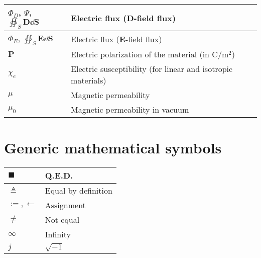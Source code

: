\documentclass{article}
\begin{document}
\begin{xltabular}{\textwidth}{XX}
	\(\Phi_D\)\cite{wiki:D-field-flux}, \(\varPsi\)\cite{ramoFieldsWavesCommunication1994}, \(\oiint_S \mathbf{D} \dd{\mathbf{S}}\)     & Electric flux (\(\mathbf{D}\)-field flux)                                                                                                                       \\ \hline
	\(\Phi_E\)\cite{wiki:electric-flux}, \(\oiint_S \mathbf{E} \dd{\mathbf{S}}\)              & Electric flux (\(\mathbf{E}\)-field flux)                                                                                                                      \\ \hline
	\(\mathbf{P}\)                                               & Electric polarization of the material (in \(\si{\coulomb\per\meter\squared}\))                                                                                                           \\ \hline
	\(\chi_e\)                                                   & Electric susceptibility (for linear and isotropic materials)                                                                                                                             \\ \hline
	\(\mu\)                                                      & Magnetic permeability                                                                                                                                                                    \\ \hline
	\(\mu_0\)                                                    & Magnetic permeability in vacuum                                                                                                                                                          \\
\end{xltabular}

\section{Generic mathematical symbols}
\begin{xltabular}{\textwidth}{XX}
	\(\blacksquare\)   & Q.E.D.                                            \\ \hline
	\(\triangleq\)     & Equal by definition                               \\ \hline
	\(:=, \leftarrow\) & Assignment \cite{rosenDiscreteMathematicsIts2011} \\ \hline
	\(\neq\)           & Not equal                                         \\ \hline
	\(\infty\)         & Infinity                                          \\ \hline
	\(j\)              & \(\sqrt{-1}\)                                     \\
\end{xltabular}
\end{document}

